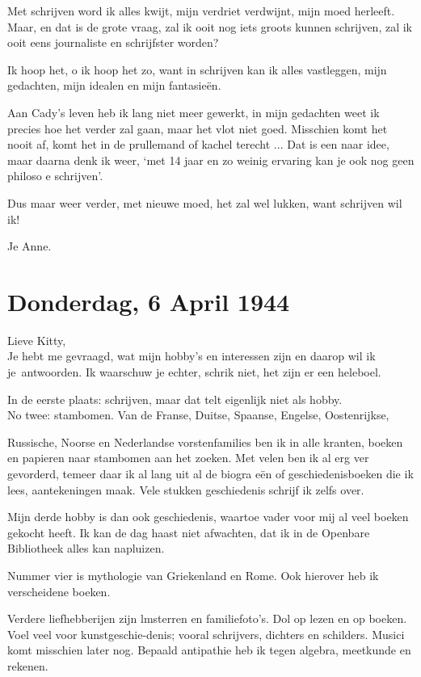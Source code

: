 \documentclass{book}
\begin{document}
Met schrijven word ik alles kwijt, mijn verdriet verdwijnt, mijn moed
herleeft. Maar, en dat is de grote vraag, zal ik ooit nog iets groots
kunnen schrijven, zal ik ooit eens journaliste en schrijfster worden?

Ik hoop het, o ik hoop het zo, want in schrijven kan ik alles
vastleggen, mijn gedachten, mijn idealen en mijn fantasieën.

Aan Cady's leven heb ik lang niet meer gewerkt, in mijn gedachten weet
ik precies hoe het verder zal gaan, maar het vlot niet goed. Misschien
komt het nooit af, komt het in de prullemand of kachel terecht ... Dat
is een naar idee, maar daarna denk ik weer, `met 14 jaar en zo weinig
ervaring kan je ook nog geen philoso e schrijven'.

Dus maar weer verder, met nieuwe moed, het zal wel lukken, want
schrijven wil ik!

Je Anne.

\chapter{Donderdag, 6 April 1944}

Lieve Kitty,\\Je hebt me gevraagd, wat mijn hobby's en interessen zijn
en daarop wil ik je~antwoorden. Ik waarschuw je echter, schrik niet, het
zijn er een heleboel.

In de eerste plaats: schrijven, maar dat telt eigenlijk niet als
hobby.\\No twee: stambomen. Van de Franse, Duitse, Spaanse, Engelse,
Oostenrijkse,

Russische, Noorse en Nederlandse vorstenfamilies ben ik in alle kranten,
boeken en papieren naar stambomen aan het zoeken. Met velen ben ik al
erg ver gevorderd, temeer daar ik al lang uit al de biogra eën of
geschiedenisboeken die ik lees, aantekeningen maak. Vele stukken
geschiedenis schrijf ik zelfs over.

Mijn derde hobby is dan ook geschiedenis, waartoe vader voor mij al veel
boeken gekocht heeft. Ik kan de dag haast niet afwachten, dat ik in de
Openbare Bibliotheek alles kan napluizen.

Nummer vier is mythologie van Griekenland en Rome. Ook hierover heb ik
verscheidene boeken.

Verdere liefhebberijen zijn lmsterren en familiefoto's. Dol op lezen en
op boeken. Voel veel voor kunstgeschie-denis; vooral schrijvers,
dichters en schilders. Musici komt misschien later nog. Bepaald
antipathie heb ik tegen algebra, meetkunde en rekenen.
\end{document}
